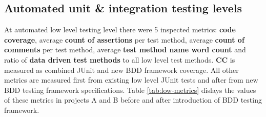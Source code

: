 {\renewcommand{\arraystretch}{1.3}
\begin{table}[H]
        \caption {Unit level testing metrics in projects and their change} \label{tab:unit-metrics}

\end{table}
}
\clearpage
\subsection{Automated unit \& integration testing levels}
At automated low level testing level there were 5 inspected metrics: \textbf{code coverage}, average \textbf{count of assertions} per test method,
average \textbf{count of comments} per test method, average \textbf{test method name word count} and ratio of \textbf{data driven test methods} to
all low level test methods. \textbf{CC} is measured as combined JUnit and new BDD framework coverage. All other metrics
are measured first from existing low level JUnit tests and after from new BDD testing framework specifications.
Table \ref{tab:low-metrics} dislays the values of these metrics in projects A and B before and after introduction of BDD testing framework.


